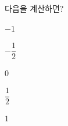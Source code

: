 다음을 계산하면?
\begin{choices32}{\rule[-3ex]{0pt}{8ex}$-1$}{\rule[-3ex]{0pt}{8ex}$-\dfrac{1}{2}$}{\rule[-3ex]{0pt}{8ex}$0$}{\rule[-3ex]{0pt}{8ex}$\dfrac{1}{2}$}{\rule[-3ex]{0pt}{8ex}$1$}\end{choices32}
